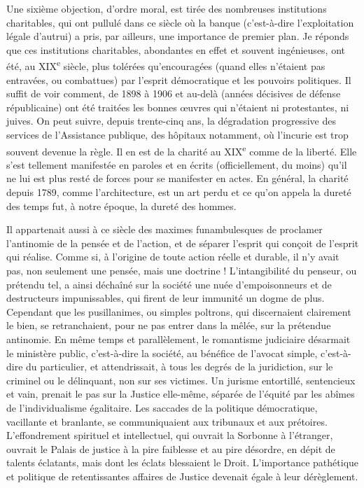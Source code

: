 \documentclass[french,twoside]{book} %
\begin{document}
Une sixième objection, d’ordre moral, est tirée des nombreuses institutions charitables, qui ont pullulé dans ce siècle où la banque (c’est-à-dire l’exploitation légale d’autrui) a pris, par ailleurs, une importance de premier plan. Je réponds que ces institutions charitables, abondantes en effet et souvent ingénieuses, ont été, au XIX\textsuperscript{e} siècle, plus tolérées qu’encouragées (quand elles n’étaient pas entravées, ou combattues) par l’esprit démocratique et les pouvoirs politiques. Il suffit de voir comment, de 1898 à 1906 et au-delà (années décisives de défense républicaine) ont été traitées les bonnes œuvres qui n’étaient ni protestantes, ni juives. On peut suivre, depuis trente-cinq ans, la dégradation progressive des services de l’Assistance publique, des hôpitaux notamment, où l’incurie est trop souvent devenue la règle. Il en est de la charité au XIX\textsuperscript{e} comme de la liberté. Elle s’est tellement manifestée en paroles et en écrits (officiellement, du moins) qu’il ne lui est plus resté de forces pour se manifester en actes. En général, la charité depuis 1789, comme l’architecture, est un art perdu et ce qu’on appela la dureté des temps fut, à notre époque, la dureté des hommes.\par
Il appartenait aussi à ce siècle des maximes funambulesques de proclamer l’antinomie de la pensée et de l’action, et de séparer l’esprit qui conçoit de l’esprit qui réalise. Comme si, à l’origine de toute action réelle et durable, il n’y avait pas, non seulement une pensée, mais une doctrine ! L’intangibilité du penseur, ou prétendu tel, a ainsi déchaîné sur la société une nuée d’empoisonneurs et de destructeurs impunissables, qui firent de leur immunité un dogme de plus. Cependant que les pusillanimes, ou simples poltrons, qui discernaient clairement le bien, se retranchaient, pour ne pas entrer dans la mêlée, sur la prétendue antinomie. En même temps et parallèlement, le romantisme judiciaire désarmait le ministère public, c’est-à-dire la société, au bénéfice de l’avocat simple, c’est-à-dire du particulier, et attendrissait, à tous les degrés de la juridiction, sur le criminel ou le délinquant, non sur ses victimes. Un jurisme entortillé, sentencieux et vain, prenait le pas sur la Justice elle-même, séparée de l’équité par les abîmes de l’individualisme égalitaire. Les saccades de la politique démocratique, vacillante et branlante, se communiquaient aux tribunaux et aux prétoires. L’effondrement spirituel et intellectuel, qui ouvrait la Sorbonne à l’étranger, ouvrait le Palais de justice à la pire faiblesse et au pire désordre, en dépit de talents éclatants, mais dont les éclats blessaient le Droit. L’importance pathétique et politique de retentissantes affaires de Justice devenait égale à leur dérèglement.\par
\end{document}
